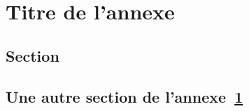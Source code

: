 
\chapter{Titre de l'annexe} %
\label{AppendixA} %

\section{Section}

\lipsum[1]

\section{Une autre section de l'annexe~\ref{AppendixA}}

\lipsum[1]


